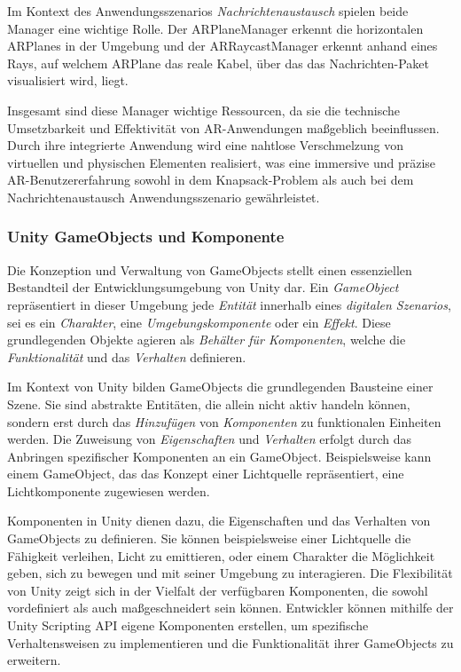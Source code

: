 Im Kontext des Anwendungsszenarios \textit{Nachrichtenaustausch} spielen beide Manager eine wichtige Rolle. Der ARPlaneManager
erkennt die horizontalen ARPlanes in der Umgebung und der ARRaycastManager erkennt anhand eines Rays, auf welchem ARPlane das reale Kabel, über
das das Nachrichten-Paket visualisiert wird, liegt.

Insgesamt sind diese Manager wichtige Ressourcen, da sie die technische Umsetzbarkeit und Effektivität von AR-Anwendungen
maßgeblich beeinflussen. Durch ihre integrierte Anwendung wird eine nahtlose Verschmelzung von virtuellen und physischen
Elementen realisiert, was eine immersive und präzise AR-Benutzererfahrung sowohl in dem Knapsack-Problem als auch bei dem
Nachrichtenaustausch Anwendungsszenario gewährleistet.

\subsubsection{Unity GameObjects und Komponente}
Die Konzeption und Verwaltung von GameObjects stellt einen essenziellen Bestandteil der Entwicklungsumgebung von Unity dar.
Ein \textit{GameObject} repräsentiert in dieser Umgebung jede \textit{Entität} innerhalb eines \textit{digitalen Szenarios},
sei es ein \textit{Charakter}, eine \textit{Umgebungskomponente} oder ein \textit{Effekt}. Diese grundlegenden Objekte
agieren als \textit{Behälter für Komponenten}, welche die \textit{Funktionalität} und das \textit{Verhalten} definieren.

Im Kontext von Unity bilden GameObjects die grundlegenden Bausteine einer Szene. Sie sind abstrakte Entitäten, die allein
nicht aktiv handeln können, sondern erst durch das \textit{Hinzufügen} von \textit{Komponenten} zu funktionalen Einheiten werden. Die Zuweisung
von \textit{Eigenschaften} und \textit{Verhalten} erfolgt durch das Anbringen spezifischer Komponenten an ein GameObject.
Beispielsweise kann einem GameObject, das das Konzept einer Lichtquelle repräsentiert, eine Lichtkomponente zugewiesen werden.

Komponenten in Unity dienen dazu, die Eigenschaften und das Verhalten von GameObjects zu definieren. Sie können beispielsweise
einer Lichtquelle die Fähigkeit verleihen, Licht zu emittieren, oder einem Charakter die Möglichkeit geben, sich zu bewegen
und mit seiner Umgebung zu interagieren. Die Flexibilität von Unity zeigt sich in der Vielfalt der verfügbaren Komponenten,
die sowohl vordefiniert als auch maßgeschneidert sein können. Entwickler können mithilfe der Unity Scripting API eigene
Komponenten erstellen, um spezifische Verhaltensweisen zu implementieren und die Funktionalität ihrer GameObjects zu erweitern.

